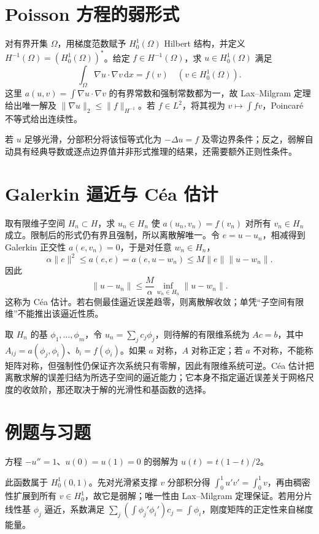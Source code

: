 \section{Poisson 方程的弱形式}
对有界开集 $\Omega$，用梯度范数赋予 $H_0^1(\Omega)$ Hilbert 结构，并定义 $H^{-1}(\Omega)=(H_0^1(\Omega))^*$。给定 $f\in H^{-1}(\Omega)$，求 $u\in H_0^1(\Omega)$ 满足
\[
 \int_\Omega\nabla u\cdot\nabla v\,\mathrm dx=f(v)
 \quad(v\in H_0^1(\Omega)).
\]
这里 $a(u,v)=\int\nabla u\cdot\nabla v$ 的有界常数和强制常数都为一，故 Lax--Milgram 定理给出唯一解及 $\|\nabla u\|_2\leq\|f\|_{H^{-1}}$。若 $f\in L^2$，将其视为 $v\mapsto\int fv$，Poincaré 不等式给出连续性。

若 $u$ 足够光滑，分部积分将该恒等式化为 $-\Delta u=f$ 及零边界条件；反之，弱解自动具有经典导数或逐点边界值并非形式推理的结果，还需要额外正则性条件。

\section{Galerkin 逼近与 Céa 估计}
取有限维子空间 $H_n\subset H$，求 $u_n\in H_n$ 使 $a(u_n,v_n)=f(v_n)$ 对所有 $v_n\in H_n$ 成立。限制后的形式仍有界且强制，所以离散解唯一。令 $e=u-u_n$，相减得到 Galerkin 正交性 $a(e,v_n)=0$，于是对任意 $w_n\in H_n$，
\[
 \alpha\|e\|^2\leq a(e,e)=a(e,u-w_n)
 \leq M\|e\|\|u-w_n\|.
\]
因此
\begin{equation}
 \|u-u_n\|\leq\frac M\alpha\inf_{w_n\in H_n}\|u-w_n\|.
 \label{eq:fa-cea}
\end{equation}
这称为 Céa 估计。若右侧最佳逼近误差趋零，则离散解收敛；单凭“子空间有限维”不能推出该逼近性质。

取 $H_n$ 的基 $\phi_1,\ldots,\phi_m$，令 $u_n=\sum_jc_j\phi_j$，则待解的有限维系统为 $Ac=b$，其中 $A_{ij}=a(\phi_j,\phi_i)$、$b_i=f(\phi_i)$。如果 $a$ 对称，$A$ 对称正定；若 $a$ 不对称，不能称矩阵对称，但强制性仍保证齐次系统只有零解，因此有限维系统可逆。Céa 估计把离散求解的误差归结为所选子空间的逼近能力；它本身不指定逼近误差关于网格尺度的收敛阶，那还取决于解的光滑性和基函数的选择。

\section{例题与习题}
\begin{example}
方程 $-u''=1$、$u(0)=u(1)=0$ 的弱解为 $u(t)=t(1-t)/2$。
\end{example}
\begin{solve}
此函数属于 $H_0^1(0,1)$。先对光滑紧支撑 $v$ 分部积分得 $\int_0^1u'v'=\int_0^1v$，再由稠密性扩展到所有 $v\in H_0^1$，故它是弱解；唯一性由 Lax--Milgram 定理保证。若用分片线性基 $\phi_j$ 逼近，系数满足 $\sum_j(\int\phi_j'\phi_i')c_j=\int\phi_i$，刚度矩阵的正定性来自梯度能量。
\end{solve}


